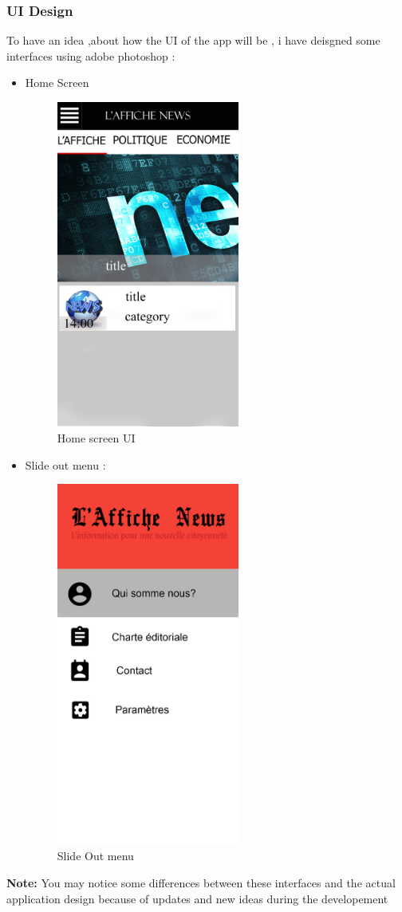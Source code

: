 \subsubsection{UI Design}
 To have an idea ,about how the UI of the app will be , i have deisgned some interfaces using adobe photoshop :
 \begin{itemize}
 \item Home Screen
 

 
\begin{figure}[H]
\centering
 \includegraphics[width=6cm]{home_screen.jpg}
 \caption{Home screen UI}
 
	\label{home screen ui}

\end{figure}
\item Slide out menu :
 \begin{figure}[H]
\centering
 \includegraphics[width=6cm]{slide_out.jpg}
 \caption{Slide Out menu}
 
	\label{slide out menu}

\end{figure}
 \end{itemize}

\textbf{Note:} You may notice some differences between these interfaces and the actual application design because of updates and new ideas during the developement
